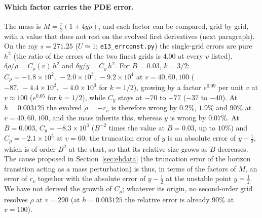 \documentclass[11pt]{article}
\begin{document}
\paragraph{Which factor carries the PDE error.} The mass is $M=\tfrac r2(1+4y\rho)$, and each factor can be compared, grid by grid, with a value that does not rest on the evolved first derivatives (next paragraph). On the ray $s=271.25$ ($U\simeq1$; \texttt{e13\_errconst.py}) the single-grid errors are pure $h^2$ (the ratio of the errors of the two finest grids is $4.00$ at every $v$ listed), $\delta\rho/\rho=C_\rho(v)\,h^2$ and $\delta y/y=C_y\,h^2$. For $B=0.03$, $k=3/2$: $C_\rho=-1.8\times10^{2},\,-2.0\times10^{3},\,-9.2\times10^{4}$ at $v=40,60,100$ ($-87,\,-4.4\times10^{2},\,-4.0\times10^{3}$ for $k=1/2$), growing by a factor $e^{0.09}$ per unit $v$ at $v\approx100$ ($e^{0.05}$ for $k=1/2$), while $C_y$ stays at $-70$ to $-77$ ($-37$ to $-40$). At $h=0.003125$ the evolved $\rho=-r_v$ is therefore wrong by $0.2\%$, $1.9\%$ and $90\%$ at $v=40,60,100$, and the mass inherits this, whereas $y$ is wrong by $0.07\%$. At $B=0.003$, $C_y=-8.3\times10^{3}$ ($B^{-2}$ times the value at $B=0.03$, up to $10\%$) and $C_\rho=-2.1\times10^{5}$ at $v=60$: the truncation error of $y$ is an absolute error of $y-\tfrac12$, which is of order $B^2$ at the start, so that its relative size grows as $B$ decreases. The cause proposed in Section~\ref{sec:ehdata} (the truncation error of the horizon transition acting as a mass perturbation) is thus, in terms of the factors of $M$, an error of $r_v$ together with the absolute error of $y-\tfrac12$ at the unstable point $y=\tfrac12$. We have not derived the growth of $C_\rho$; whatever its origin, no second-order grid resolves $\rho$ at $v=290$ (at $h=0.003125$ the relative error is already $90\%$ at $v=100$).
\end{document}
